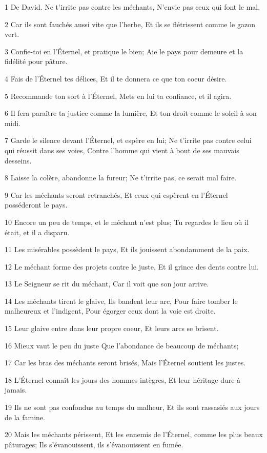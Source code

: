 \par 1 De David. Ne t'irrite pas contre les méchants, N'envie pas ceux qui font le mal.
\par 2 Car ils sont fauchés aussi vite que l'herbe, Et ils se flétrissent comme le gazon vert.
\par 3 Confie-toi en l'Éternel, et pratique le bien; Aie le pays pour demeure et la fidélité pour pâture.
\par 4 Fais de l'Éternel tes délices, Et il te donnera ce que ton coeur désire.
\par 5 Recommande ton sort à l'Éternel, Mets en lui ta confiance, et il agira.
\par 6 Il fera paraître ta justice comme la lumière, Et ton droit comme le soleil à son midi.
\par 7 Garde le silence devant l'Éternel, et espère en lui; Ne t'irrite pas contre celui qui réussit dans ses voies, Contre l'homme qui vient à bout de ses mauvais desseins.
\par 8 Laisse la colère, abandonne la fureur; Ne t'irrite pas, ce serait mal faire.
\par 9 Car les méchants seront retranchés, Et ceux qui espèrent en l'Éternel posséderont le pays.
\par 10 Encore un peu de temps, et le méchant n'est plus; Tu regardes le lieu où il était, et il a disparu.
\par 11 Les misérables possèdent le pays, Et ils jouissent abondamment de la paix.
\par 12 Le méchant forme des projets contre le juste, Et il grince des dents contre lui.
\par 13 Le Seigneur se rit du méchant, Car il voit que son jour arrive.
\par 14 Les méchants tirent le glaive, Ils bandent leur arc, Pour faire tomber le malheureux et l'indigent, Pour égorger ceux dont la voie est droite.
\par 15 Leur glaive entre dans leur propre coeur, Et leurs arcs se brisent.
\par 16 Mieux vaut le peu du juste Que l'abondance de beaucoup de méchants;
\par 17 Car les bras des méchants seront brisés, Mais l'Éternel soutient les justes.
\par 18 L'Éternel connaît les jours des hommes intègres, Et leur héritage dure à jamais.
\par 19 Ils ne sont pas confondus au temps du malheur, Et ils sont rassasiés aux jours de la famine.
\par 20 Mais les méchants périssent, Et les ennemis de l'Éternel, comme les plus beaux pâturages; Ils s'évanouissent, ils s'évanouissent en fumée.
